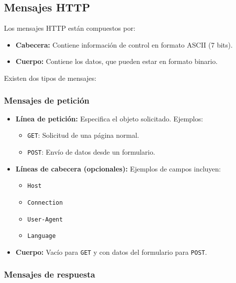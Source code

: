 \documentclass{article}
\begin{document}
\newpage

\subsection{Mensajes HTTP}

Los mensajes HTTP están compuestos por:

\begin{itemize}
    \item \textbf{Cabecera:} Contiene información de control en formato ASCII (7 bits).
    \item \textbf{Cuerpo:} Contiene los datos, que pueden estar en formato binario.
\end{itemize}

Existen dos tipos de mensajes:

\subsubsection{Mensajes de petición}

\begin{itemize}
    \item \textbf{Línea de petición:} Especifica el objeto solicitado. Ejemplos:
    \begin{itemize}
        \item \texttt{GET}: Solicitud de una página normal.
        \item \texttt{POST}: Envío de datos desde un formulario.
    \end{itemize}

    \item \textbf{Líneas de cabecera (opcionales):} Ejemplos de campos incluyen:
    \begin{itemize}
        \item \texttt{Host}
        \item \texttt{Connection}
        \item \texttt{User-Agent}
        \item \texttt{Language}
    \end{itemize}

    \item \textbf{Cuerpo:} Vacío para \texttt{GET} y con datos del formulario para \texttt{POST}.
\end{itemize}

\subsubsection{Mensajes de respuesta}
\end{document}
